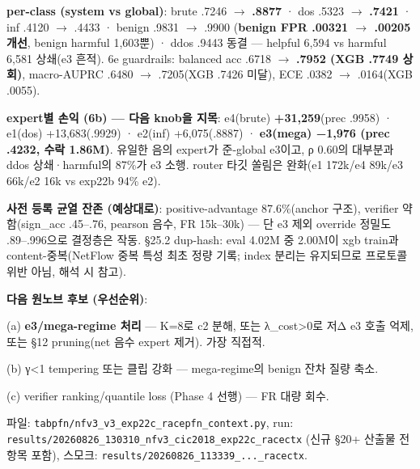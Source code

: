 \textbf{per-class (system vs global)}: brute .7246 \ensuremath{\rightarrow} \textbf{.8877} · dos .5323 \ensuremath{\rightarrow} \textbf{.7421} · inf .4120 \ensuremath{\rightarrow} .4433 · benign .9831 \ensuremath{\rightarrow} .9900 (\textbf{benign FPR .00321 \ensuremath{\rightarrow} .00205 개선}, benign harmful 1,603뿐) · ddos .9443 동결 — helpful 6,594 vs harmful 6,581 상쇄(e3 흔적). 6e guardrails: balanced acc .6718 \ensuremath{\rightarrow} \textbf{.7952 (XGB .7749 상회)}, macro-AUPRC .6480 \ensuremath{\rightarrow} .7205(XGB .7426 미달), ECE .0382 \ensuremath{\rightarrow} .0164(XGB .0055).

\textbf{expert별 손익 (6b) — 다음 knob을 지목}: e4(brute) \textbf{+\allowbreak{}31,259}(prec .9958) · e1(dos) +\allowbreak{}13,683(.9929) · e2(inf) +\allowbreak{}6,075(.8887) · \textbf{e3(mega) −1,976 (prec .4232, 수락 1.86M)}. 유일한 음의 expert가 준-global e3이고, ρ 0.60의 대부분과 ddos 상쇄·harmful의 87\%가 e3 소행. router 타깃 쏠림은 완화(e1 172k/\allowbreak{}e4 89k/\allowbreak{}e3 66k/\allowbreak{}e2 16k vs exp22b 94\% e2).

\textbf{사전 등록 균열 잔존 (예상대로)}: positive-advantage 87.6\%(anchor 구조), verifier 약함(sign\_\allowbreak{}acc .45–.76, pearson 음수, FR 15k–30k) — 단 e3 제외 override 정밀도 .89–.996으로 결정층은 작동. §25.2 dup-hash: eval 4.02M 중 2.00M이 xgb train과 content-중복(NetFlow 중복 특성 최초 정량 기록; index 분리는 유지되므로 프로토콜 위반 아님, 해석 시 참고).

\textbf{다음 원노브 후보 (우선순위)}:

\par\noindent \textbullet\enspace (a) \textbf{e3/\allowbreak{}mega-regime 처리} — K=\allowbreak{}8로 c2 분해, 또는 λ\_\allowbreak{}cost>0로 저Δ e3 호출 억제, 또는 §12 pruning(net 음수 expert 제거). 가장 직접적.


\par\noindent \textbullet\enspace (b) γ<1 tempering 또는 클립 강화 — mega-regime의 benign 잔차 질량 축소.


\par\noindent \textbullet\enspace (c) verifier ranking/\allowbreak{}quantile loss (Phase 4 선행) — FR 대량 회수.


파일: \texttt{tabpfn/\allowbreak{}\allowbreak{}n\allowbreak{}fv3\_\allowbreak{}\allowbreak{}v3\_\allowbreak{}\allowbreak{}e\allowbreak{}xp22c\_\allowbreak{}\allowbreak{}ra\allowbreak{}cepfn\_\allowbreak{}\allowbreak{}co\allowbreak{}ntext.\allowbreak{}py\allowbreak{}}, run: \texttt{results/\allowbreak{}\allowbreak{}20260826\allowbreak{}\_\allowbreak{}\allowbreak{}130310\_\allowbreak{}\allowbreak{}nfv3\_\allowbreak{}\allowbreak{}cic\allowbreak{}2018\_\allowbreak{}\allowbreak{}exp\allowbreak{}22c\_\allowbreak{}\allowbreak{}race\allowbreak{}ctx} (신규 §20+\allowbreak{} 산출물 전 항목 포함), 스모크: \texttt{results/\allowbreak{}\allowbreak{}20260826\allowbreak{}\_\allowbreak{}\allowbreak{}113339\_\allowbreak{}\allowbreak{}.\allowbreak{}.\allowbreak{}.\allowbreak{}\_\allowbreak{}\allowbreak{}race\allowbreak{}ctx}.

